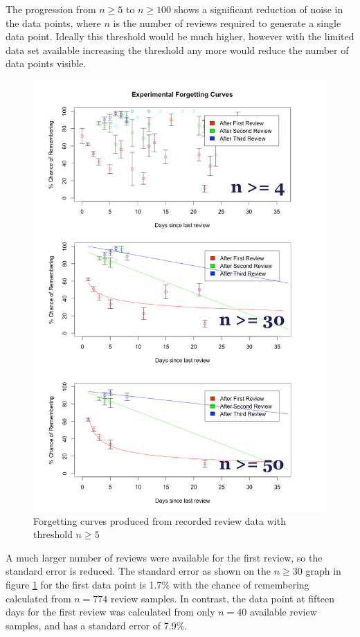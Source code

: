 The progression from $n \geq 5$ to $n \geq 100$ shows a significant reduction of noise
in the data points, where $n$ is the number of reviews required to generate a single data
point. Ideally this threshold would be much higher, however with the limited data set
available increasing the threshold any more would reduce the number of data points
visible.

\begin{figure}[h!]
\includegraphics[width=14cm]{img/forgettingcurves.jpg}
\caption{Forgetting curves produced from recorded review data with threshold $n \geq 5$}
\label{fig_expforgetcurve}
\end{figure}

A much larger number of reviews were available for the first review, so the standard error
is reduced. The standard error as shown on the $n \geq 30$
graph in figure \ref{fig_expforgetcurve} for the first
data point is 1.7\% with the chance of remembering calculated from $n = 774$ review samples.
In contrast, the data point at fifteen days for the first review was calculated from only 
$n = 40$ available review samples, and has a standard error of 7.9\%.
\newpage
